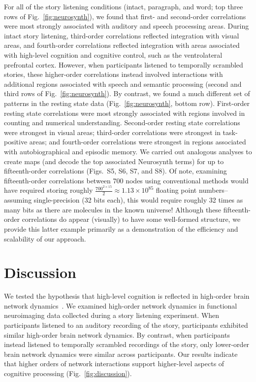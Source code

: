 \documentclass[english]{article}
\newcommand{\intact}{S5}
\newcommand{\para}{S6}
\newcommand{\word}{S7}
\newcommand{\rest}{S8}
\begin{document}
For all of the story listening conditions (intact, paragraph, and
word; top three rows of Fig.~\ref{fig:neurosynth}), we found that
first- and second-order correlations were most strongly associated
with auditory and speech processing areas.  During intact story
listening, third-order correlations reflected integration with visual
areas, and fourth-order correlations reflected integration with areas
associated with high-level cognition and cognitive control, such as
the ventrolateral prefrontal cortex.  However, when participants
listened to temporally scrambled stories, these higher-order
correlations instead involved interactions with additional regions
associated with speech and semantic processing (second and third rows
of Fig.~\ref{fig:neurosynth}).  By contrast, we found
a much different set of patterns in the resting state data
(Fig.~\ref{fig:neurosynth}, bottom row).
First-order resting state correlations were most strongly associated
with regions involved in counting and numerical understanding.
Second-order resting state correlations were strongest in visual
areas; third-order correlations were strongest in task-positive areas;
and fourth-order correlations were strongest in regions associated
with autobiographical and episodic memory.  We carried out analogous
analyses to create maps (and decode the top associated Neurosynth
terms) for up to fifteenth-order correlations (Figs.~\intact, \para,
\word, and \rest).  Of note, examining fifteenth-order correlations
between 700 nodes using conventional methods would have required
storing roughly
$\frac{700^{2 \times 15}}{2} \approx 1.13 \times 10^{85}$ floating
point numbers-- assuming single-precision (32 bits each), this would
require roughly 32 times as many bits as there are molecules in the
known universe!  Although these fifteenth-order correlations do appear
(visually) to have some well-formed structure, we provide this latter
example primarily as a demonstration of the efficiency and scalability
of our approach.






\section*{Discussion}
We tested the hypothesis that high-level cognition is reflected in
high-order brain network dynamics~\citep[e.g., see][]{SoloEtal19,
  ReimEtal17}.  We examined high-order network dynamics in functional
neuroimaging data collected during a story listening experiment.  When
participants listened to an auditory recording of the story,
participants exhibited similar high-order brain network dynamics.  By
contrast, when participants instead listened to temporally scrambled
recordings of the story, only lower-order brain network dynamics were
similar across participants.  Our results indicate that higher orders
of network interactions support higher-level aspects of cognitive
processing (Fig.~\ref{fig:discussion}).
\end{document}
